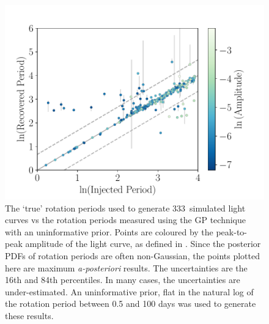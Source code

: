 \documentclass[useAMS, usenatbib, preprint, 12pt]{aastex}
\newcommand{\naigrain}{333}
\begin{document}
\begin{figure}
\begin{center}
\includegraphics[width=6in, clip=true]{figures/comparison_noprior_02_13.pdf}
\caption{The `true' rotation periods used to generate \naigrain\
simulated light curves vs the rotation periods measured using the GP
technique with an uninformative prior.
    Points are coloured by the peak-to-peak amplitude of the light curve, as
    defined in \citet{Aigrain2015}.
Since the posterior PDFs of rotation periods are often non-Gaussian,
    the points plotted here are maximum {\it a-posteriori} results.
The uncertainties are the 16th and 84th percentiles.
In many cases, the uncertainties are under-estimated.
An uninformative prior, flat in the natural log of the rotation period between
    0.5 and 100 days was used to generate these results.
    }
\label{fig:compare_mcmc_noprior}
\end{center}
\end{figure}
\end{document}
